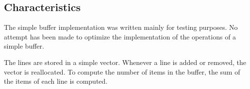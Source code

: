 \subsection{Characteristics}

The simple buffer implementation was written mainly for testing
purposes.  No attempt has been made to optimize the implementation of
the operations of a simple buffer.

The lines are stored in a \commonlisp{} simple vector.  Whenever a
line is added or removed, the vector is reallocated.  To compute the
number of items in the buffer, the sum of the items of each line is
computed.
